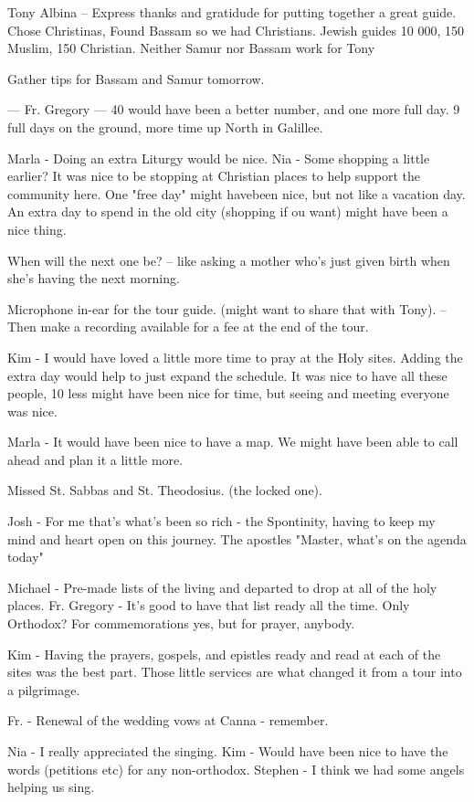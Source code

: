 \documentclass[letterpaper]{report}
\begin{document}
Tony Albina -- Express thanks and gratidude for putting together a great guide.
Chose Christinas, Found Bassam so we had Christians.
Jewish guides 10 000, 150 Muslim, 150 Christian.
Neither Samur nor Bassam work for Tony

Gather tips for Bassam and Samur tomorrow.

--- Fr. Gregory ---
40 would have been a better number, and one more full day. 9 full days on the ground, more time up North in Galillee.

Marla - Doing an extra Liturgy would be nice.
Nia - Some shopping a little earlier? 
    It was nice to be stopping at Christian places to help support the community here.
One "free day" might havebeen nice, but not like a vacation day. An extra day to spend in the old city (shopping if ou want) might have been a nice thing.

When will the next one be? -- like asking a mother who's just given birth when she's having the next morning.

Microphone in-ear for the tour guide. (might want to share that with Tony). -- Then make a recording available for a fee at the end of the tour.

Kim - I would have loved a little more time to pray at the Holy sites.
    Adding the extra day would help to just expand the schedule.
It was nice to have all these people, 10 less might have been nice for time, but seeing and meeting everyone was nice.

Marla - It would have been nice to have a map.
We might have been able to call ahead and plan it a little more.

Missed St. Sabbas and St. Theodosius. (the locked one).

Josh - For me that's what's been so rich - the Spontinity, having to keep my mind and heart open on this journey.
  The apostles "Master, what's on the agenda today"

Michael - Pre-made lists of the living and departed to drop at all of the holy places.
   Fr. Gregory - It's good to have that list ready all the time.
Only Orthodox?  For commemorations yes, but for prayer, anybody.

Kim - Having the prayers, gospels, and epistles ready and read at each of the sites was the best part.  Those little services are what changed it from a tour into a pilgrimage.

Fr. - Renewal of the wedding vows at Canna - remember.

Nia - I really appreciated the singing.
Kim - Would have been nice to have the words (petitions etc) for any non-orthodox.
Stephen - I think we had some angels helping us sing.
\end{document}
